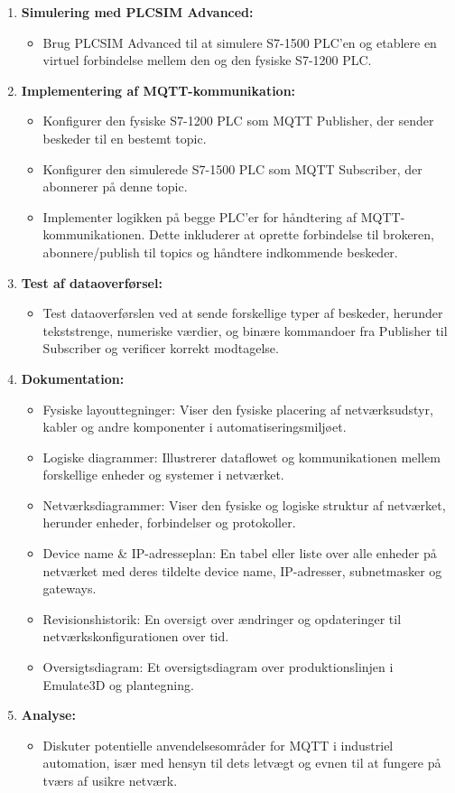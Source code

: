 \begin{enumerate}
	\item \textbf{Simulering med PLCSIM Advanced:}
	\begin{itemize}
		\item Brug PLCSIM Advanced til at simulere S7-1500 PLC'en og etablere en virtuel forbindelse mellem den og den fysiske S7-1200 PLC.
	\end{itemize}
	
	\item \textbf{Implementering af MQTT-kommunikation:}
	\begin{itemize}
		\item Konfigurer den fysiske S7-1200 PLC som MQTT Publisher, der sender beskeder til en bestemt topic.
		\item Konfigurer den simulerede S7-1500 PLC som MQTT Subscriber, der abonnerer på denne topic.
		\item Implementer logikken på begge PLC'er for håndtering af MQTT-kommunikationen. Dette inkluderer at oprette forbindelse til brokeren, abonnere/publish til topics og håndtere indkommende beskeder.
	\end{itemize}
	
	\item \textbf{Test af dataoverførsel:}
	\begin{itemize}
		\item Test dataoverførslen ved at sende forskellige typer af beskeder, herunder tekststrenge, numeriske værdier, og binære kommandoer fra Publisher til Subscriber og verificer korrekt modtagelse.
	\end{itemize}
	
	\item \textbf{Dokumentation:}
	\begin{itemize}
		\item Fysiske layouttegninger: Viser den fysiske placering af netværksudstyr, kabler og andre komponenter i automatiseringsmiljøet.
		\item Logiske diagrammer: Illustrerer dataflowet og kommunikationen mellem forskellige enheder og systemer i netværket.
		\item Netværksdiagrammer: Viser den fysiske og logiske struktur af netværket, herunder enheder, forbindelser og protokoller.
		\item Device name \& IP-adresseplan: En tabel eller liste over alle enheder på netværket med deres tildelte device name, IP-adresser, subnetmasker og gateways.
		\item Revisionshistorik: En oversigt over ændringer og opdateringer til netværkskonfigurationen over tid.
		\item Oversigtsdiagram: Et oversigtsdiagram over produktionslinjen i Emulate3D og plantegning.
	\end{itemize}
	
	\item \textbf{Analyse:}
	\begin{itemize}
		\item Diskuter potentielle anvendelsesområder for MQTT i industriel automation, især med hensyn til dets letvægt og evnen til at fungere på tværs af usikre netværk.
	\end{itemize}
\end{enumerate}

